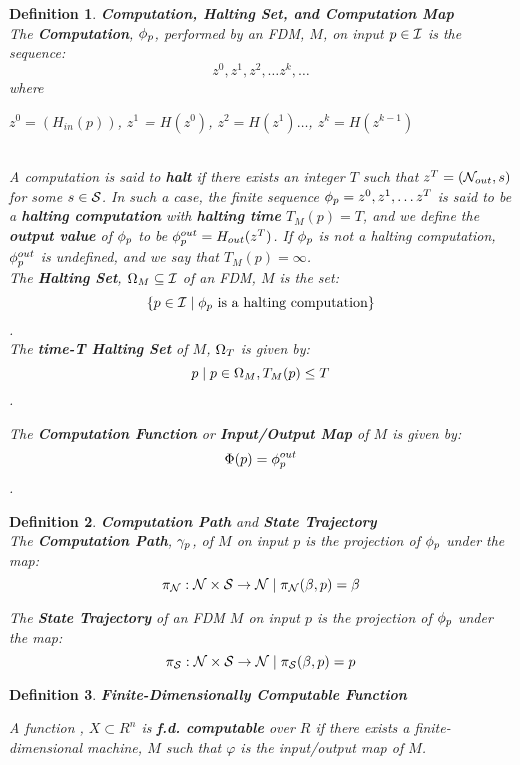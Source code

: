 \documentclass[twoside]{article}
\newtheorem{definition}{Definition}[section]
\begin{document}
\begin{definition}{\textbf{Computation, Halting Set, and Computation Map}}\\
  
  The \textbf{Computation}, $\phi_p$, performed by an FDM, $M$,
  on input $p \in \mathcal{I}$ is the sequence: 
  $$z^0, z^1, z^2, \ldots z^k, \ldots$$ 
  where\\ 
  \centerline{$z^0 = (H_{in}(p))$, $z^1$ = $H(z^0)$, $z^2 = H(z^1) \ldots$, $z^k = H(z^{k-1})$}\\

  A computation is said to \textbf{halt} if there exists an integer
  $T$ such that $z^T = (\mathcal{N}_{out}, s)$ for some $s \in \mathcal{S}$.
  In such a case, the finite sequence $\phi_p = z^0, z^1, \ldots
  z^T$ is said to be a \textbf{halting computation} with
  \textbf{halting time} $T_M(p) = T$, and we define the \textbf{output
    value} of $\phi_p$ to be $\phi_{p}^{out} = H_{out}(z^T)$.  If
  $\phi_p$ is not a halting computation, $\phi_{p}^{out}$ is
  undefined, and we say that $T_M(p) = \infty$.\\

  The \textbf{Halting Set}, $\Omega_M \subseteq \mathcal{I}$ of an FDM,
  $M$ is the set: 
  $$\{p \in \mathcal{I} \mid \phi_p \text{ is a halting computation}\}$$.\\
  \noindent The \textbf{time-T Halting Set} of $M$, $\Omega_T$ is given by:
  $$p \mid p \in \Omega_M, T_M(p) \leq T$$.
  
  The \textbf{Computation Function} or \textbf{Input/Output Map} of
  $M$  is given by:
  $$\Phi(p) = \phi_{p}^{out}$$.
\end{definition}
\begin{definition}{\textbf{Computation Path} and \textbf{State Trajectory}}\\
  
  The \textbf{Computation Path}, $\gamma_p$, of $M$ on
  input $p$ is the projection of $\phi_p$ under the map:
  $$\pi_{\mathcal{N}}:\mathcal{N} \times \mathcal{S} \rightarrow \mathcal{N} \mid \pi_{\mathcal{N}}(\beta, p) = \beta$$
  
  The \textbf{State Trajectory} of an FDM $M$ on input $p$ is the
  projection of $\phi_p$ under the map:
  $$\pi_{\mathcal{S}}:\mathcal{N} \times \mathcal{S} \rightarrow \mathcal{N} \mid \pi_{\mathcal{S}}(\beta, p) = p$$
\end{definition}

\begin{definition}{\textbf{Finite-Dimensionally Computable Function}}
  
  A function , $X \subset R^n$ is
  \textbf{f.d. computable} over $R$ if there exists a
  finite-dimensional machine, $M$ such that $\varphi$ is the
  input/output map of $M$.
  
\end{definition}
\end{document}
